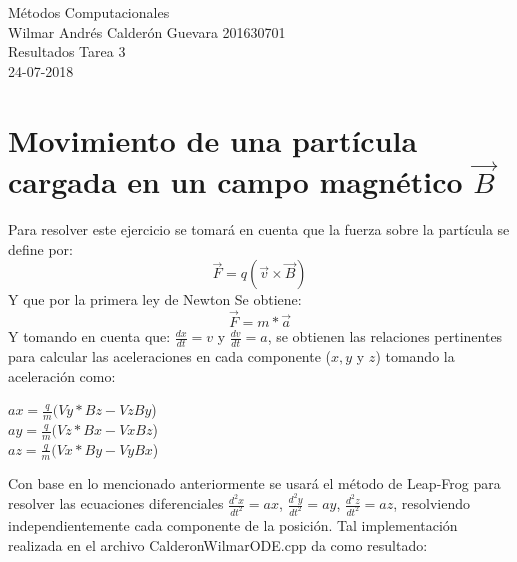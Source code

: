 \documentclass[11pt,letterpaper]{exam}
\begin{document}
\begin{center}
{\Large Métodos Computacionales} \\
Wilmar Andr\'es Calder\'on Guevara 201630701 \\
Resultados Tarea 3\\
24-07-2018\\
\end{center}

\begin{abstract}
El caso de estudio en este trabajo es la soluci\'on de Ecuaciones Diferenciales, para observar como es el comportamiento de dos diferentes sistemas. En el primer sistema, se estudia una particula cargada ($q=1.5,m=2.5$) que se encuentra bajo la influencia de un campo magn\'etico uniforme $\vec{B}=(0.0,0.0,3.0)$ y se busca encontrar la posici\'on futura de la part\'icula con base en las condiciones iniciales dadas, Con el fin de resolver este problema se har\'a uso de ecuaciones diferenciales ordinarias. Por otro lado, el segundo sistema consta del estudio de una membrana de un tambor, la cual se buscar\'a analizar tomando los extremos (Frontera) del tambor fijos y libre para observar las diferencias entre el comportamiento de la membrana para cada caso particular.
\end{abstract}


\section{Movimiento de una part\'icula cargada en un campo magn\'etico $\vec{B}$}

Para resolver este ejercicio se tomar\'a en cuenta que la fuerza sobre la part\'icula se define por:
\begin{equation}
\vec{F}= q(\vec{v} \times{\vec{B}})
\end{equation} 
Y que por la primera ley de Newton Se obtiene:
\begin{equation}
\vec{F}= m*\vec{a}
\end{equation}
Y tomando en cuenta que: $\frac{dx}{dt}=v$ y $\frac{dv}{dt}=a$, se obtienen las relaciones pertinentes para calcular las aceleraciones en cada componente ($x,y$ y $z$) tomando la aceleraci\'on como: \\
\begin{center}
$ax=\frac{q}{m}(Vy*Bz-VzBy$) \\
$ay=\frac{q}{m}(Vz*Bx-VxBz$) \\
$az=\frac{q}{m}(Vx*By-VyBx$) \\
\end{center}
Con base en lo mencionado anteriormente se usar\'a el m\'etodo de Leap-Frog para resolver las ecuaciones diferenciales $\frac{{d}^2x}{{dt}^2}=ax$, $\frac{{d}^2y}{{dt}^2}=ay$, $\frac{{d}^2z}{{dt}^2}=az$, resolviendo independientemente cada componente de la posici\'on.
Tal implementaci\'on realizada en el archivo CalderonWilmarODE.cpp da como resultado:
\end{document}
